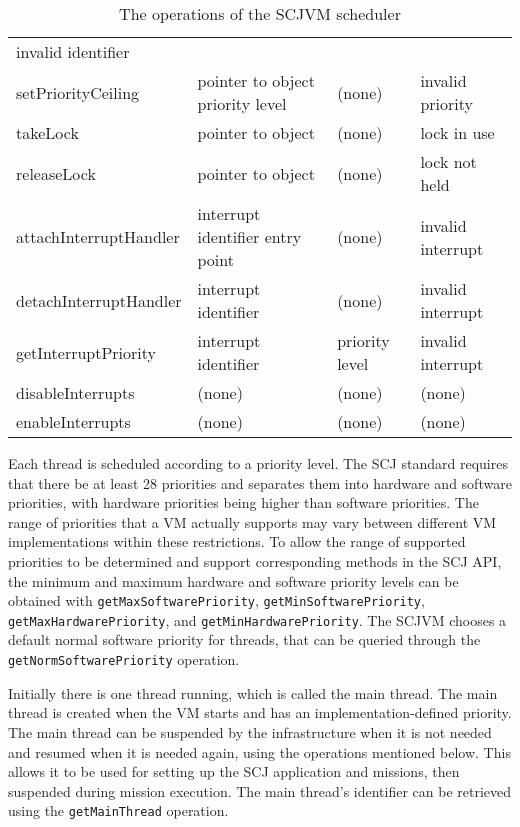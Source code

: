 \documentclass[a4paper,10pt]{report}
\begin{document}
\begin{table}[ht]
\begin{tabular}{|l|p{3cm}|p{2.2cm}|p{2.7cm}|}
    invalid identifier
    \\setPriorityCeiling &
    pointer to object \newline
    priority level &
    (none) &
    invalid priority
    \\takeLock &
    pointer to object &
    (none) &
    lock in use
    \\releaseLock &
    pointer to object &
    (none) &
    lock not held
    \\attachInterruptHandler &
    interrupt identifier \newline
    entry point &
    (none) &
    invalid interrupt
    \\detachInterruptHandler &
    interrupt identifier &
    (none) &
    invalid interrupt
    \\getInterruptPriority &
    interrupt identifier &
    priority level &
    invalid interrupt
    \\disableInterrupts &
    (none) &
    (none) &
    (none)
    \\enableInterrupts &
    (none) &
    (none) &
    (none)
  \end{tabular}
  \caption{The operations of the SCJVM scheduler}
  \label{scheduler-table}
\end{table}

Each thread is scheduled according to a priority level.
The SCJ standard requires that there be at least 28 priorities and
separates them into hardware and software priorities, with hardware
priorities being higher than software priorities.
The range of priorities that a VM actually supports may vary between
different VM implementations within these restrictions.
To allow the range of supported priorities to be determined and
support corresponding methods in the SCJ API, the minimum and maximum
hardware and software priority levels can be obtained with
\texttt{get\-Max\-Soft\-ware\-Pri\-or\-ity},
\texttt{get\-Min\-Soft\-ware\-Pri\-or\-ity},
\texttt{get\-Max\-Hard\-ware\-Pri\-or\-ity}, and
\texttt{get\-Min\-Hard\-ware\-Pri\-or\-ity}.
The SCJVM chooses a default normal software priority for threads, that
can be queried through the
\texttt{get\-Norm\-Soft\-ware\-Pri\-or\-ity} operation.

Initially there is one thread running, which is called the main
thread.
The main thread is created when the VM starts and has an
implementation-defined priority.
The main thread can be suspended by the infrastructure when it is not
needed and resumed when it is needed again, using the operations
mentioned below.
This allows it to be used for setting up the SCJ application and
missions, then suspended during mission execution.
The main thread's identifier can be retrieved using the
\texttt{get\-Main\-Thread} operation.
\end{document}
